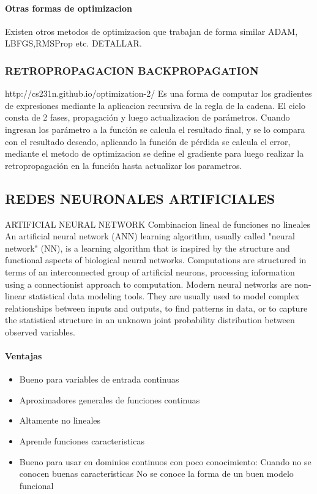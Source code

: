 \documentclass[a4paper,10pt]{article}
\begin{document}
      \paragraph{Otras formas de optimizacion}
	Existen otros metodos de optimizacion que trabajan de forma similar ADAM, LBFGS,RMSProp etc. DETALLAR.
	
    \subsubsection{RETROPROPAGACION BACKPROPAGATION}
      http://cs231n.github.io/optimization-2/
      Es una forma  de computar los gradientes de expresiones mediante la aplicacion recursiva de la regla de la cadena.
      El ciclo consta de 2 fases, propagación y luego actualizacion de parámetros. Cuando ingresan los parámetro a la función se calcula el resultado final, y se lo compara con el resultado 
      deseado, aplicando la función de pérdida se calcula el error, mediante el metodo de optimizacion se define el gradiente para luego realizar la retropropagación en la función hasta 
      actualizar los parametros.

    \subsection{REDES NEURONALES ARTIFICIALES}
      ARTIFICIAL NEURAL NETWORK
      Combinacion lineal de funciones no lineales
      An artificial neural network (ANN) learning algorithm, usually called "neural network" (NN), is a learning algorithm that is inspired by the structure and functional aspects 
      of biological neural networks. Computations are structured in terms of an interconnected group of artificial neurons, processing information using a connectionist approach 
      to computation. Modern neural networks are non-linear statistical data modeling tools. They are usually used to model complex relationships between inputs and outputs, 
      to find patterns in data, or to capture the statistical structure in an unknown joint probability distribution between observed variables.
      \paragraph {Ventajas}
	\begin{itemize}
	  \item Bueno para variables de entrada continuas
	  \item Aproximadores generales de funciones continuas
	  \item Altamente no lineales
	  \item Aprende funciones caracteristicas
	  \item Bueno para usar en dominios continuos con poco conocimiento:
	    \subitem Cuando no se conocen buenas caracteristicas
	    \subitem No se conoce la forma de un buen modelo funcional
	\end{itemize}
\end{document}
